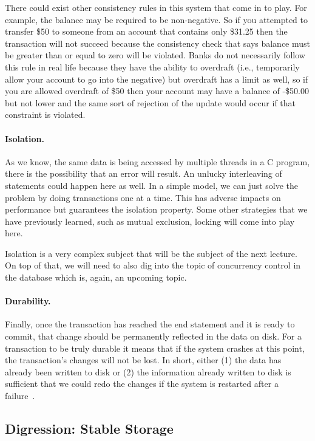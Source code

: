 There could exist other consistency rules in this system that come in to play. For example, the balance may be required to be non-negative. So if you attempted to transfer \$50 to someone from an account that contains only \$31.25 then the transaction will not succeed because the consistency check that says balance must be greater than or equal to zero will be violated. Banks do not necessarily follow this rule in real life because they have the ability to overdraft (i.e., temporarily allow your account to go into the negative) but overdraft has a limit as well, so if you are allowed overdraft of \$50 then your account may have a balance of -\$50.00 but not lower and the same sort of rejection of the update would occur if that constraint is violated.

\paragraph{Isolation.} As we know, the same data is being accessed by multiple threads in a C program, there is the possibility that an error will result. An unlucky interleaving of statements could happen here as well. In a simple model, we can just solve the problem by doing transactions one at a time. This has adverse impacts on performance but guarantees the isolation property. Some other strategies that we have previously learned, such as mutual exclusion, locking will come into play here. 

Isolation is a very complex subject that will be the subject of the next lecture. On top of that, we will need to also dig into the topic of concurrency control in the database which is, again, an upcoming topic. 

\paragraph{Durability.} Finally, once the transaction has reached the end statement and it is ready to commit, that change should be permanently reflected in the data on disk. For a transaction to be truly durable it means that if the system crashes at this point, the transaction's changes will not be lost. In short, either (1) the data has already been written to disk or (2) the information already written to disk is sufficient that we could redo the changes if the system is restarted after a failure~\cite{dsc}.

\subsection*{Digression: Stable Storage}

